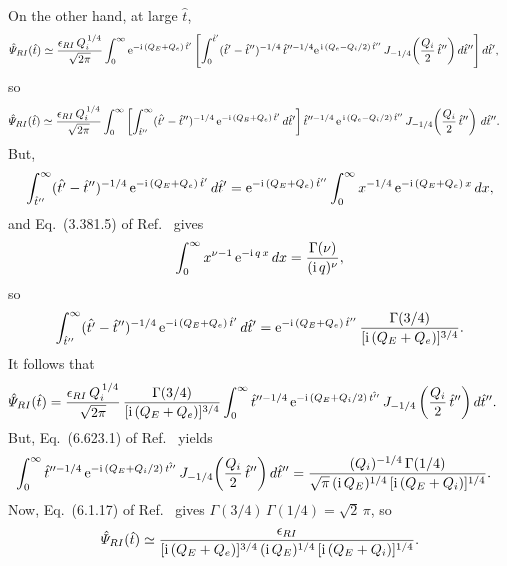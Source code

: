 \documentclass[12pt,prb,aps]{revtex4-1}
\begin{document}
On the other hand, at large $\hat{t}$, 
\begin{align}
\hat{\mit\Psi}_{RI}(\hat{t}) &\simeq \frac{\epsilon_{RI}\,Q_i^{\,1/4}}{\sqrt{2\pi}}\int_0^{\infty}{\rm e}^{-{\rm i}\,(Q_E+Q_e)\,\hat{t}'}
\left[\int_0^{\hat{t}'}(\hat{t}'-\hat{t}'')^{-1/4}\,\hat{t}''^{-1/4}
{\rm e}^{\,{\rm i}\,(Q_e-Q_i/2)\,\hat{t}''}\,J_{-1/4}\!\left(\frac{Q_i}{2}\,\hat{t}''\right)d\hat{t}''\right]d\hat{t}',
\end{align}
so
\begin{align}
\hat{\mit\Psi}_{RI}(\hat{t}) &\simeq \frac{\epsilon_{RI}\,Q_i^{\,1/4}}{\sqrt{2\pi}}
\int_0^\infty\left[\int_{\hat{t}''}^\infty(\hat{t'}-\hat{t}'')^{-1/4}\,{\rm e}^{-{\rm i}\,(Q_E+Q_e)\,\hat{t}'}\,d\hat{t}'\right]
 \hat{t}''^{-1/4}\,{\rm e}^{\,{\rm i}\,(Q_e-Q_i/2)\,\hat{t}''}\,J_{-1/4}\!\left(\frac{Q_i}{2}\,\hat{t}''\right)\,d\hat{t}''.
\end{align}
But,
\begin{align}
\int_{\hat{t}''}^\infty(\hat{t'}-\hat{t}'')^{-1/4}\,{\rm e}^{-{\rm i}\,(Q_E+Q_e)\,\hat{t}'}\,d\hat{t}'={\rm e}^{-{\rm i}\,(Q_E+Q_e)\,\hat{t}''} \int_0^\infty
x^{-1/4}\,{\rm e}^{-{\rm i}\,(Q_E+Q_e)\,x}\,dx,
\end{align}
and Eq.~(3.381.5) of Ref.~ gives
\begin{equation}
\int_0^\infty x^{\nu-1}\,{\rm e}^{-{\rm i}\,q\,x}\,dx = \frac{\Gamma(\nu)}{({\rm i}\,q)^{\nu}},
\end{equation}
so 
\begin{equation}
\int_{\hat{t}''}^\infty (\hat{t'}-\hat{t}'')^{-1/4}\,{\rm e}^{-{\rm i}\,(Q_E+Q_e)\,\hat{t}'}\,d\hat{t}'={\rm e}^{-{\rm i}\,(Q_E+Q_e)\,\hat{t}''} \, \frac{\Gamma(3/4)}{[{\rm i}\,(Q_E+Q_e)]^{3/4}}.
\end{equation}
It follows that
\begin{align}
\hat{\mit\Psi}_{RI}(\hat{t})&= \frac{\epsilon_{RI}\,Q_i^{\,1/4}}{\sqrt{2\pi}}\,\frac{\Gamma(3/4)}{[{\rm i}\,(Q_E+Q_e)]^{3/4}}
\int_0^\infty \hat{t}''^{-1/4}\,{\rm e}^{-{\rm i}\,(Q_E+Q_i/2)\,\hat{t''}}\,J_{-1/4}\left(\frac{Q_i}{2}\,\hat{t}''\right)d\hat{t}''.
\end{align}
But, Eq.~(6.623.1) of Ref.~  yields 
\begin{align}
&\int_0^\infty \hat{t}''^{-1/4}\,{\rm e}^{-{\rm i}\,(Q_E+Q_i/2)\,\hat{t''}}\,J_{-1/4}\!\left(\frac{Q_i}{2}\,\hat{t}''\right)d\hat{t}'' 
= \frac{(Q_i)^{-1/4}\,\Gamma(1/4)}{\sqrt{\pi}\,({\rm i}\,Q_E)^{1/4}\,[{\rm i}\,(Q_E+Q_i)]^{1/4}}.
\end{align}
Now, Eq.~(6.1.17) of Ref.~ gives
$\Gamma(3/4)\,\Gamma(1/4)= \sqrt{2}\,\pi$,
so
\begin{equation}\label{ril}
\hat{\mit\Psi}_{RI}(\hat{t})\simeq 
\frac{\epsilon_{RI}}{[{\rm i}\,(Q_E+Q_e)]^{3/4}\,({\rm i}\,Q_E)^{1/4}\,[{\rm i}\,(Q_E+Q_i)]^{1/4}}.
\end{equation}
\end{document}
